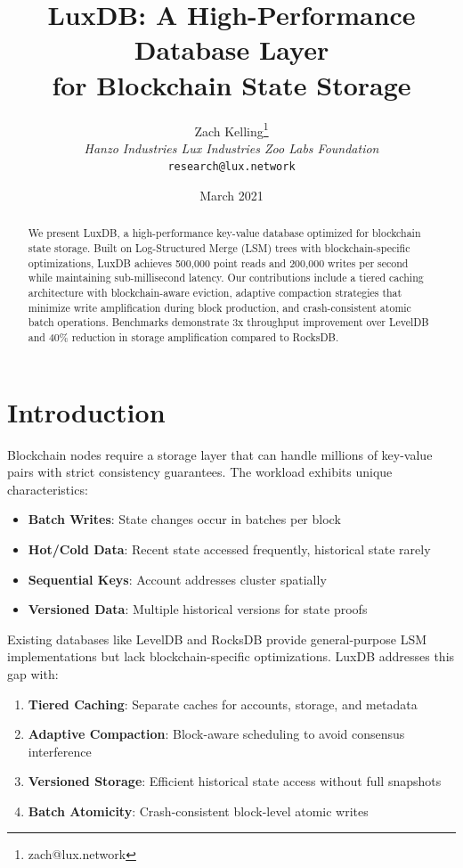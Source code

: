 \documentclass[11pt,a4paper]{article}
\title{LuxDB: A High-Performance Database Layer\\for Blockchain State Storage}
\author{Zach Kelling\thanks{zach@lux.network} \\ \textit{Hanzo Industries \quad Lux Industries \quad Zoo Labs Foundation} \\ \texttt{research@lux.network}}
\date{March 2021}
\begin{document}
\maketitle

\begin{abstract}
We present LuxDB, a high-performance key-value database optimized for blockchain state storage. Built on Log-Structured Merge (LSM) trees with blockchain-specific optimizations, LuxDB achieves 500,000 point reads and 200,000 writes per second while maintaining sub-millisecond latency. Our contributions include a tiered caching architecture with blockchain-aware eviction, adaptive compaction strategies that minimize write amplification during block production, and crash-consistent atomic batch operations. Benchmarks demonstrate 3x throughput improvement over LevelDB and 40\% reduction in storage amplification compared to RocksDB.
\end{abstract}

\section{Introduction}

Blockchain nodes require a storage layer that can handle millions of key-value pairs with strict consistency guarantees. The workload exhibits unique characteristics:

\begin{itemize}
    \item \textbf{Batch Writes}: State changes occur in batches per block
    \item \textbf{Hot/Cold Data}: Recent state accessed frequently, historical state rarely
    \item \textbf{Sequential Keys}: Account addresses cluster spatially
    \item \textbf{Versioned Data}: Multiple historical versions for state proofs
\end{itemize}

Existing databases like LevelDB and RocksDB provide general-purpose LSM implementations but lack blockchain-specific optimizations. LuxDB addresses this gap with:

\begin{enumerate}
    \item \textbf{Tiered Caching}: Separate caches for accounts, storage, and metadata
    \item \textbf{Adaptive Compaction}: Block-aware scheduling to avoid consensus interference
    \item \textbf{Versioned Storage}: Efficient historical state access without full snapshots
    \item \textbf{Batch Atomicity}: Crash-consistent block-level atomic writes
\end{enumerate}
\end{document}
